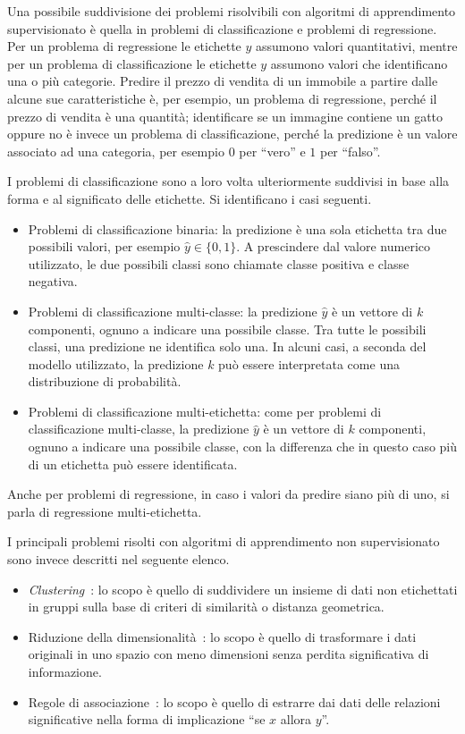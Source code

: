 Una possibile suddivisione dei problemi risolvibili con algoritmi di apprendimento supervisionato è quella in problemi di classificazione e problemi di regressione.
Per un problema di regressione le etichette $y$ assumono valori quantitativi, mentre per un problema di classificazione le etichette $y$ assumono valori che identificano una o più categorie. 
Predire il prezzo di vendita di un immobile a partire dalle alcune sue caratteristiche è, per esempio, un problema di regressione, perché il prezzo di vendita è una quantità;
identificare se un immagine contiene un gatto oppure no è invece un problema di classificazione, perché la predizione è un valore associato ad una categoria, per esempio $0$ per ``vero'' e $1$ per ``falso''.

I problemi di classificazione sono a loro volta ulteriormente suddivisi in base alla forma e al significato delle etichette. Si identificano i casi seguenti.
\begin{itemize}
    \item Problemi di classificazione binaria: la predizione è una sola etichetta tra due possibili valori, per esempio $\hat{y} \in \{0,1\}$. A prescindere dal valore numerico utilizzato, le due possibili classi sono chiamate classe positiva e classe negativa.
    \item Problemi di classificazione multi-classe: la predizione $\hat{y}$ è un vettore di $k$ componenti, ognuno a indicare una possibile classe.
    Tra tutte le possibili classi, una predizione ne identifica solo una. 
    In alcuni casi, a seconda del modello utilizzato, la predizione $k$ può essere interpretata come una distribuzione di probabilità.  
    \item Problemi di classificazione multi-etichetta: come per problemi di classificazione multi-classe, la predizione $\hat{y}$ è un vettore di $k$ componenti, ognuno a indicare una possibile classe, con la differenza che in questo caso più di un etichetta può essere identificata. 
\end{itemize}

Anche per problemi di regressione, in caso i valori da predire siano più di uno, si parla di regressione multi-etichetta.

I principali problemi risolti con algoritmi di apprendimento non supervisionato sono invece descritti nel seguente elenco.
\begin{itemize}
    \item \emph{Clustering}~\cite{elements-of-statistical-learning}: lo scopo è quello di suddividere un insieme di dati non etichettati in gruppi sulla base di criteri di similarità o distanza geometrica.
    \item Riduzione della dimensionalità~\cite{elements-of-statistical-learning}: lo scopo è quello di trasformare i dati originali in uno spazio con meno dimensioni senza perdita significativa di informazione.
    \item Regole di associazione~\cite{elements-of-statistical-learning}: lo scopo è quello di estrarre dai dati delle relazioni significative nella forma di implicazione ``se $x$ allora $y$''.
\end{itemize}

